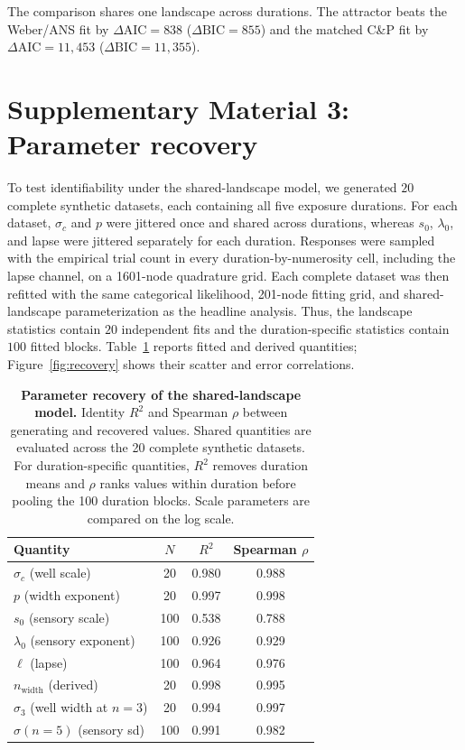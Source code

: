 \documentclass[Afour,sageh,times]{sagej}
\begin{document}
The comparison shares one landscape across durations. The attractor beats the Weber/ANS fit by $\Delta\mathrm{AIC}=838$ ($\Delta\mathrm{BIC}=855$) and the matched C\&P fit by $\Delta\mathrm{AIC}=11{,}453$ ($\Delta\mathrm{BIC}=11{,}355$).

\section{Supplementary Material 3: Parameter recovery}
\label{sm:recovery}

To test identifiability under the shared-landscape model, we generated $20$ complete synthetic datasets, each containing all five exposure durations. For each dataset, $\sigma_c$ and $p$ were jittered once and shared across durations, whereas $s_0$, $\lambda_0$, and lapse were jittered separately for each duration. Responses were sampled with the empirical trial count in every duration-by-numerosity cell, including the lapse channel, on a 1601-node quadrature grid. Each complete dataset was then refitted with the same categorical likelihood, 201-node fitting grid, and shared-landscape parameterization as the headline analysis. Thus, the landscape statistics contain $20$ independent fits and the duration-specific statistics contain $100$ fitted blocks. Table~\ref{tab:recovery} reports fitted and derived quantities; Figure~\ref{fig:recovery} shows their scatter and error correlations.

\begin{table}[t]
  \centering
  \caption{\textbf{Parameter recovery of the shared-landscape model.} Identity $R^2$ and Spearman $\rho$ between generating and recovered values. Shared quantities are evaluated across the 20 complete synthetic datasets. For duration-specific quantities, $R^2$ removes duration means and $\rho$ ranks values within duration before pooling the 100 duration blocks. Scale parameters are compared on the log scale.}
  \label{tab:recovery}
  \setlength{\tabcolsep}{6pt}
  \begin{tabular}{lccc}
  \hline
  Quantity & $N$ & $R^2$ & Spearman $\rho$ \\
  \hline
  $\sigma_c$ (well scale) & 20 & 0.980 & 0.988 \\
  $p$ (width exponent) & 20 & 0.997 & 0.998 \\
  $s_0$ (sensory scale) & 100 & 0.538 & 0.788 \\
  $\lambda_0$ (sensory exponent) & 100 & 0.926 & 0.929 \\
  $\ell$ (lapse) & 100 & 0.964 & 0.976 \\[2pt]
  $n_{\mathrm{width}}$ (derived) & 20 & 0.998 & 0.995 \\
  $\sigma_3$ (well width at $n=3$) & 20 & 0.994 & 0.997 \\
  $\sigma(n=5)$ (sensory sd) & 100 & 0.991 & 0.982 \\
  \hline
  \end{tabular}
\end{table}
\end{document}
